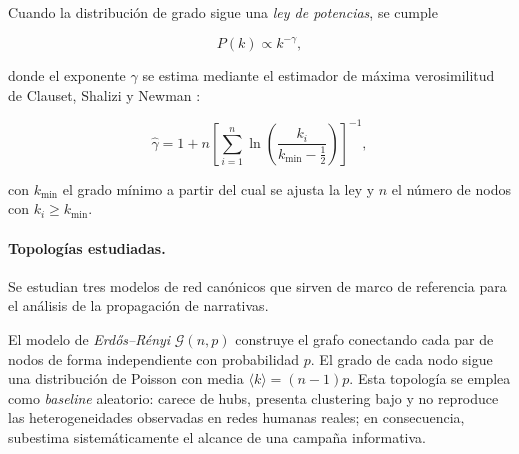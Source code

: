 Cuando la distribución de grado sigue una \emph{ley de potencias}, se cumple

\begin{equation}
  P(k) \propto k^{-\gamma},
  \label{eq:powerlaw}
\end{equation}

donde el exponente $\gamma$ se estima mediante el estimador de máxima verosimilitud de Clauset, Shalizi y Newman \cite{Clauset2009}:

\[
  \hat{\gamma} = 1 + n \left[ \sum_{i=1}^{n} \ln\!\left( \frac{k_i}{k_{\min} - \tfrac{1}{2}} \right) \right]^{-1},
\]

con $k_{\min}$ el grado mínimo a partir del cual se ajusta la ley y $n$ el número de nodos con $k_i \geq k_{\min}$.

\paragraph{Topologías estudiadas.}
Se estudian tres modelos de red canónicos que sirven de marco de referencia para el análisis de la propagación de narrativas.

El modelo de \emph{Erdős–Rényi} $\mathcal{G}(n, p)$ \cite{ErdosRenyi1960} construye el grafo conectando cada par de nodos de forma independiente con probabilidad $p$. El grado de cada nodo sigue una distribución de Poisson con media $\langle k \rangle = (n-1)p$. Esta topología se emplea como \emph{baseline} aleatorio: carece de hubs, presenta clustering bajo y no reproduce las heterogeneidades observadas en redes humanas reales; en consecuencia, subestima sistemáticamente el alcance de una campaña informativa.

